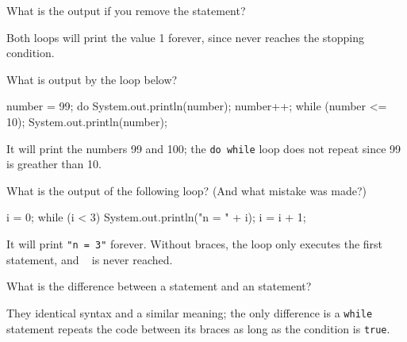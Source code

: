 \Q What is the output if you remove the  statement?

\begin{answer}
Both loops will print the value 1 forever, since  never reaches the stopping condition.
\end{answer}


\Q What is output by the loop below?

\begin{minipage}{0.49\textwidth}
\begin{javalst}
    number = 99;
    do {
        System.out.println(number);
        number++;
    } while (number <= 10);
    System.out.println(number);
\end{javalst}
\end{minipage}
\hfill
\begin{minipage}{0.49\textwidth}
\begin{answer}
It will print the numbers 99 and 100; the \texttt{do while} loop does not repeat since 99 is greather than 10.
\end{answer}
\end{minipage}
\vspace{1ex}


\Q What is the output of the following loop? (And what mistake was made?)

\begin{minipage}{0.49\textwidth}
\begin{javalst}
    i = 0;
    while (i < 3) 
        System.out.println("n = " + i);
        i = i + 1;
\end{javalst}
\end{minipage}
\hfill
\begin{minipage}{0.49\textwidth}
\begin{answer}
It will print \texttt{"n = 3"} forever. Without braces, the loop only executes the first statement, and ~ is never reached.
\end{answer}
\end{minipage}
\vspace{1ex}


\Q What is the difference between a  statement and an  statement?

\begin{answer}
They identical syntax and a similar meaning; the only difference is a \texttt{while} statement repeats the code between its braces as long as the condition is \texttt{true}.
\end{answer}
